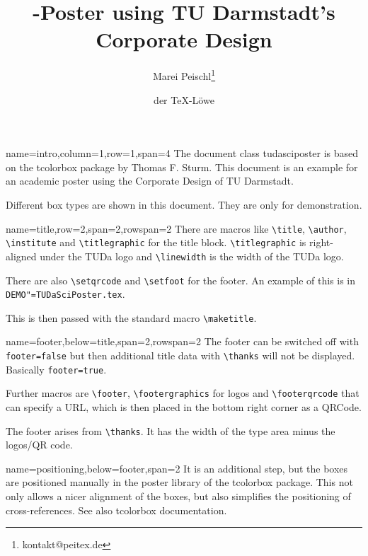 \documentclass[
	english,%
	accentcolor=9c,%
]{tudasciposter}
\title{\pkg{tcolorbox}-Poster using TU Darmstadt's Corporate Design}
\author{Marei Peischl\inst{*}\thanks{kontakt@peitex.de} \and der \TeX-Löwe}
\institute{\inst{*}pei\TeX{} \TeX{}nical Solutions, Hamburg}
\newcommand*{\file}[1]{\texttt{#1}}
\newcommand*{\code}[1]{\texttt{#1}}
\newcommand*{\pkg}[1]{\textsf{#1}}
\newcommand*{\cls}[1]{\textsf{#1}}
\newcommand{\tbs}{\textbackslash}
\newcommand*{\macro}[1]{\code{\tbs#1}}
\begin{document}
\begin{tcbposter}[
	poster={
		columns=4,
		rows=7,
		spacing=1cm,
	},]

\begin{posterboxenv}[title=Intro]{name=intro,column=1,row=1,span=4}
	The document class \cls{tudasciposter} is based on the \pkg{tcolorbox} package by Thomas F. Sturm.
	This document is an example for an academic poster using the Corporate Design of TU Darmstadt.

	Different box types are shown in this document. They are only for demonstration.
\end{posterboxenv}

\begin{posterboxenv}[title=Title]{name=title,row=2,span=2,rowspan=2}
	There are macros like \macro{title}, \macro{author}, \macro{institute} and \macro{titlegraphic} for the title block.
	\macro{titlegraphic} is right-aligned under the TUDa logo and
	\macro{linewidth} is the width of the TUDa logo.

	There are also \macro{setqrcode} and \macro{setfoot} for the footer. An example of this is in \file{DEMO"=TUDaSciPoster.tex}.

	This is then passed with the standard macro \macro{maketitle}.
\end{posterboxenv}

\begin{posterboxenv}[title=Footer]{name=footer,below=title,span=2,rowspan=2}
	The footer can be switched off with \code{footer=false} but then additional title data with \macro{thanks} will not be displayed. Basically \code{footer=true}.

	Further macros are \macro{footer}, \macro{footergraphics} for logos and \macro{footerqrcode} that can specify a URL, which is then placed in the bottom right corner as a QRCode.

	The footer arises from \macro{thanks}. It has the width of the type area minus the logos/QR code.
\end{posterboxenv}

\begin{posterboxenv}[title=Placement of boxes]{name=positioning,below=footer,span=2}
	It is an additional step, but the boxes are positioned manually in the \pkg{poster} library of the \pkg{tcolorbox} package.
	This not only allows a nicer alignment of the boxes, but also simplifies the positioning of cross-references.
	See also \pkg{tcolorbox} documentation.
\end{posterboxenv}


\end{tcbposter}
\end{document}
